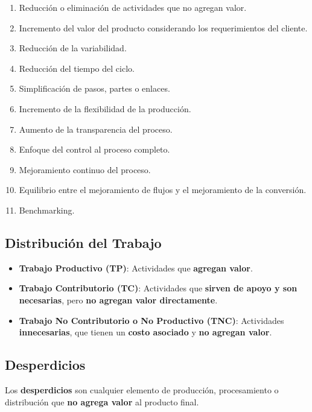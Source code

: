 \begin{enumerate}
    \item Reducción o eliminación de actividades que no agregan valor.
    \item Incremento del valor del producto considerando los requerimientos del cliente.
    \item Reducción de la variabilidad.
    \item Reducción del tiempo del ciclo.
    \item Simplificación de pasos, partes o enlaces.
    \item Incremento de la flexibilidad de la producción.
    \item Aumento de la transparencia del proceso.
    \item Enfoque del control al proceso completo.
    \item Mejoramiento continuo del proceso.
    \item Equilibrio entre el mejoramiento de flujos y el mejoramiento de la conversión.
    \item Benchmarking.
\end{enumerate}

\subsection*{Distribución del Trabajo}

\begin{itemize}
    \item \textbf{Trabajo Productivo (TP)}: Actividades que \textbf{agregan valor}.
    
    \item \textbf{Trabajo Contributorio (TC)}: Actividades que \textbf{sirven de apoyo y son necesarias}, pero \textbf{no agregan valor directamente}.
    
    \item \textbf{Trabajo No Contributorio o No Productivo (TNC)}: Actividades \textbf{innecesarias}, que tienen un \textbf{costo asociado} y \textbf{no agregan valor}.
\end{itemize}

\subsection*{Desperdicios}

\noindent Los \textbf{desperdicios} son cualquier elemento de producción, procesamiento o distribución que \textbf{no agrega valor} al producto final.

